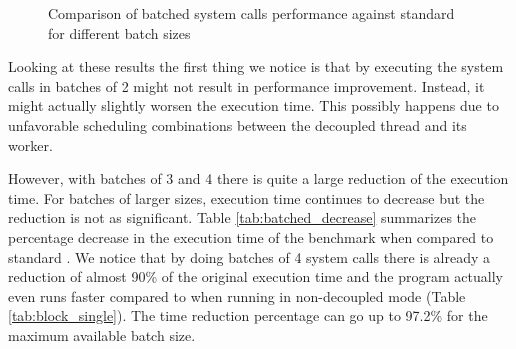 \begin{figure}[h]
\caption{Comparison of batched system calls performance against standard
  \llinux for different batch sizes}
\label{fig:batched}
\end{figure}

\newcommand{\Ga}{\xintfloatexpr [-13] (\Fa-\Cf)*100/\Cf\relax}
\newcommand{\Gb}{\xintfloatexpr [-13] (\Fb-\Cf)*100/\Cf\relax}
\newcommand{\Gc}{\xintfloatexpr [-13] (\Fc-\Cf)*100/\Cf\relax}
\newcommand{\Gd}{\xintfloatexpr [-13] (\Fd-\Cf)*100/\Cf\relax}
\newcommand{\Ge}{\xintfloatexpr [-13] (\Fe-\Cf)*100/\Cf\relax}
\newcommand{\Gf}{\xintfloatexpr [-13] (\Ff-\Cf)*100/\Cf\relax}
\newcommand{\Gg}{\xintfloatexpr [-13] (\Fg-\Cf)*100/\Cf\relax}
\newcommand{\Gh}{\xintfloatexpr [-13] (\Fh-\Cf)*100/\Cf\relax}

Looking at these results the first thing we notice is that by executing the
system calls in batches of 2 might not result in performance improvement.
Instead, it might actually slightly worsen the execution time. This possibly
happens due to unfavorable scheduling combinations between the decoupled thread
and its \memsc worker.

However, with batches of 3 and 4 there is quite a large reduction of the
execution time. For batches of larger sizes, execution time continues to
decrease but the reduction is not as significant. Table
\ref{tab:batched_decrease} summarizes the percentage decrease in the execution
time of the benchmark when compared to standard \llinux. We notice that by
doing batches of 4 system calls there is already a reduction of almost 90\% of
the original execution time and the program actually even runs faster compared
to when running in non-decoupled mode (Table \ref{tab:block_single}). The time
reduction percentage can go up to 97.2\% for the maximum available batch size.

